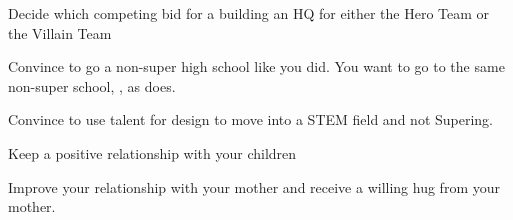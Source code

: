 \documentclass[char]{LRSguildcamp1}
\begin{document}
\begin{itemz}[Goals]
	\item Decide which competing bid for a building an HQ for either the Hero Team or the Villain Team
	
	\item Convince \cTween{} to go a non-super high school like you did. You want \cTween{} to go to the same non-super school, \pNormalSchool, as \cTeen{} does. 
	
	\item Convince \cTeen{} to use \cTeen{\their} talent for design to move into a STEM field and not Supering.
	
	\item Keep a positive relationship with your children
	
	\item Improve your relationship with your mother and receive a willing hug from your mother.  
	\end{itemz}

\begin{itemz}[Notes]
	\item 
\end{itemz}
\end{document}
